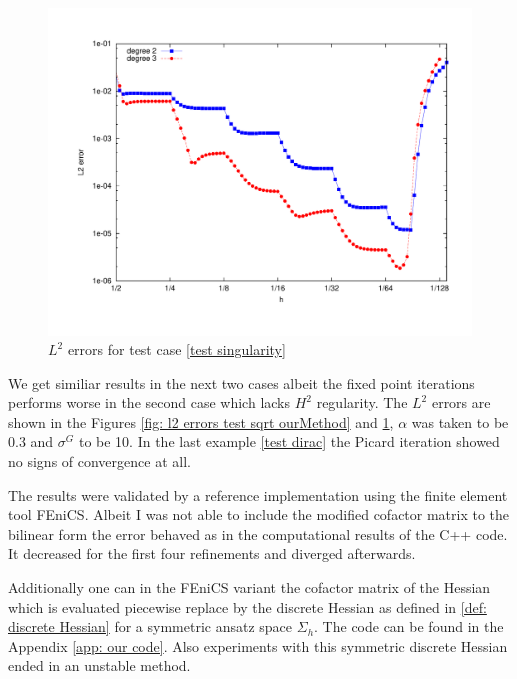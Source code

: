   
  \begin{figure}[H]
  	\centering
  	\includegraphics[scale =0.37]{plots/MA2.pdf}
  	\caption{$L^2$ errors for test case \ref{test singularity}}
  	\label{fig: l2 errors test singularity ourMethod}
  \end{figure}
We get similiar results in the next two cases albeit the fixed point iterations performs worse in the second case which lacks $H^2$ regularity. The $L^2$ errors are shown in the Figures \ref{fig: l2 errors test sqrt ourMethod} and \ref{fig: l2 errors test singularity ourMethod}, $\alpha$ was taken to be 0.3 and $\sigma^G$ to be 10. In the last example \ref{test dirac} the Picard iteration showed no signs of convergence at all.

  

The results were validated by a reference implementation using the finite element tool FEniCS. Albeit I was not able to include the modified cofactor matrix to the bilinear form the error behaved as in the computational results of the C++ code. It decreased for the first four refinements and diverged afterwards. 

Additionally one can in the FEniCS variant the cofactor matrix of the Hessian which is evaluated piecewise replace by the discrete Hessian as defined in \ref{def: discrete Hessian} for a symmetric ansatz space $\Sigma_h$. The code can be found in the Appendix \ref{app: our code}. Also experiments with this symmetric discrete Hessian ended in an unstable method.